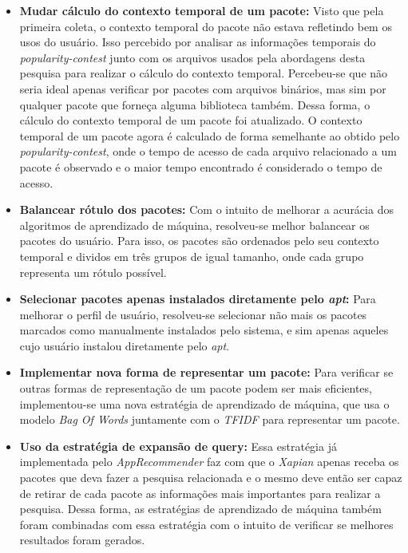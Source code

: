 \begin{itemize}
   \item \textbf{Mudar cálculo do contexto temporal de um pacote: } Visto que
   pela primeira coleta, o contexto temporal do pacote não estava
   refletindo bem os usos do usuário. Isso percebido por analisar as informações
   temporais do \textit{popularity-contest} junto com os arquivos usados pela
   abordagens desta pesquisa para realizar o cálculo do contexto temporal.
   Percebeu-se que não seria ideal apenas verificar por pacotes com
   arquivos binários, mas sim por qualquer pacote que forneça alguma
   biblioteca também. Dessa forma, o cálculo do contexto temporal de um
   pacote foi atualizado. O contexto temporal de um pacote agora é calculado de
   forma semelhante ao obtido pelo \textit{popularity-contest}, onde o tempo de
   acesso de cada arquivo relacionado a um pacote é observado e o maior tempo
   encontrado é considerado o tempo de acesso.

   \item \textbf{Balancear rótulo dos pacotes: } Com o intuito de melhorar
   a acurácia dos algoritmos de aprendizado de máquina, resolveu-se melhor
   balancear os pacotes do usuário. Para isso, os pacotes são ordenados pelo seu
   contexto temporal e dividos em três grupos de igual tamanho, onde cada grupo
   representa um rótulo possível.

   \item \textbf{Selecionar pacotes apenas instalados diretamente pelo
   \textit{apt}:} Para melhorar o perfil de usuário, resolveu-se selecionar não
   mais os pacotes marcados como manualmente instalados pelo sistema, e sim
   apenas aqueles cujo usuário instalou diretamente pelo \textit{apt}.

   \item \textbf{Implementar nova forma de representar um pacote: } Para
   verificar se outras formas de representação de um pacote podem ser mais
   eficientes, implementou-se uma nova estratégia de aprendizado de máquina, que
   usa o modelo \textit{Bag Of Words} juntamente com o \textit{TFIDF} para
   representar um pacote.

   \item \textbf{Uso da estratégia de expansão de query: } Essa estratégia já
   implementada pelo \textit{AppRecommender} faz com que o \textit{Xapian}
   apenas receba os pacotes que deva fazer a pesquisa relacionada e o mesmo deve
   então ser capaz de retirar de cada pacote as informações mais importantes
   para realizar a pesquisa. Dessa forma, as estratégias de aprendizado de
   máquina também foram combinadas com essa estratégia com o intuito de
   verificar se melhores resultados foram gerados.


\end{itemize}
